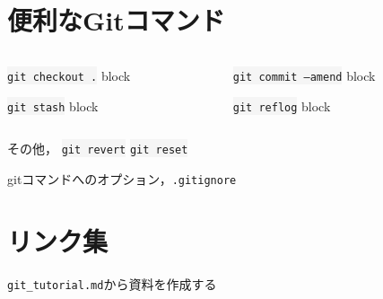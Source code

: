 \documentclass[12pt,dvipdfmx,svgnames,uplatex,aspectratio=169]{beamer}
\newcommand{\git}[1]{{\colorbox{WhiteSmoke}{\texttt{#1}}}}  %
\begin{document}
\section{便利なGitコマンド}
\begin{frame}{\insertsection}
  \begin{columns}[T] %
    \begin{column}{0.5\textwidth}
      \begin{block}{\git{git checkout .}}
        block
      \end{block}
      \begin{block}{\git{git stash}}
        block
      \end{block}
    \end{column}
    \begin{column}{0.5\textwidth}
      \begin{block}{\git{git commit --amend}}
        block
      \end{block}
      \begin{block}{\git{git reflog}}
        block
      \end{block}
    \end{column}
  \end{columns}
  その他， \git{git revert} \git{git reset}

  gitコマンドへのオプション，\texttt{.gitignore}
\end{frame}

\section{リンク集}
\begin{frame}{\insertsection}
  \texttt{git\_tutorial.md}から資料を作成する
\end{frame}
\end{document}
